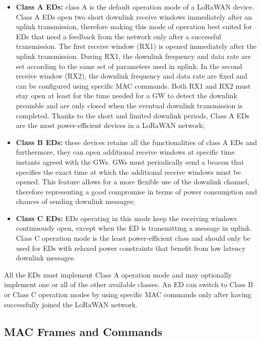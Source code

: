\begin{itemize}
 \item \textbf{Class A \glspl{ED}:} class A is the default operation mode of a LoRaWAN device. Class A \glspl{ED} open two short downlink receive windows immediately after an uplink transmission, therefore making this mode of operation best suited for \glspl{ED} that need a feedback from the network only after a successful transmission. The first receive window (RX1) is opened immediately after the uplink transmission. During RX1, the downlink frequency and data rate are set according to the same set of parameters used in uplink. In the second receive window (RX2), the downlink frequency and data rate are fixed and can be configured using specific MAC commands. Both RX1 and RX2 must stay open at least for the time needed for a \gls{GW} to detect the downlink preamble and are only closed when the eventual downlink transmission is completed. Thanks to the short and limited downlink periods, Class A \glspl{ED} are the most power-efficient devices in a LoRaWAN network;
 
\item \textbf{Class B \glspl{ED}:} these devices retains all the functionalities of class A \glspl{ED} and furthermore, they can open additional receive windows at specific time instants agreed with the \glspl{GW}. \glspl{GW} must periodically send a beacon that specifies the exact time at which the additional receive windows must be opened. This feature allows for a more flexible use of the downlink channel, therefore representing a good compromise in terms of power consumption and chances of sending downlink messages;

\item \textbf{Class C \glspl{ED}:} \glspl{ED} operating in this mode keep the receiving windows continuously open, except when the ED is transmitting a message in uplink. Class C operation mode is the least power-efficient class and should only be used for \glspl{ED} with relaxed power constraints that benefit from low latency downlink messages.

\end{itemize}

All the \glspl{ED} must implement Class A operation mode and may optionally implement one or all of the other available classes. An \gls{ED} can switch to Class B or Class C operation modes by using specific MAC commands only after having successfully joined the LoRaWAN network. 

\subsection{MAC Frames and Commands}

